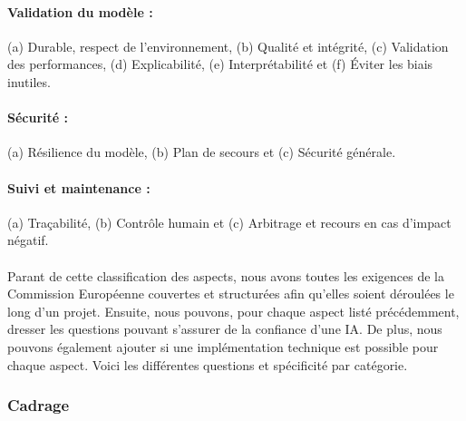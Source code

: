 \documentclass[10pt, french, a4paper]{report}
\begin{document}
\paragraph{Validation du modèle :} (a) Durable, respect de l'environnement, (b) Qualité et intégrité, (c) Validation des performances, (d) Explicabilité, (e) Interprétabilité et (f) \uppercase{é}viter les biais inutiles.

\paragraph{Sécurité :} (a) Résilience du modèle, (b) Plan de secours et (c) Sécurité générale.

\paragraph{Suivi et maintenance :} (a) Traçabilité, (b) Contrôle humain et (c) Arbitrage et recours en cas d'impact négatif.

\paragraph{}
Parant de cette classification des aspects, nous avons toutes les exigences de la Commission Européenne couvertes et structurées afin qu'elles soient déroulées le long d'un projet. Ensuite, nous pouvons, pour chaque aspect listé précédemment, dresser les questions pouvant s'assurer de la confiance d'une IA. De plus, nous pouvons également ajouter si une implémentation technique est possible pour chaque aspect. Voici les différentes questions et spécificité par catégorie.

\subsubsection{Cadrage}
\end{document}
